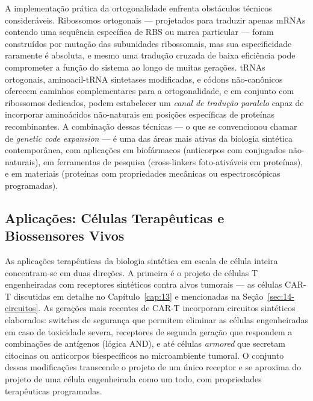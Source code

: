 A implementação prática da ortogonalidade enfrenta obstáculos técnicos consideráveis. Ribossomos ortogonais --- projetados para traduzir apenas mRNAs contendo uma sequência específica de RBS ou marca particular --- foram construídos por mutação das subunidades ribossomais, mas sua especificidade raramente é absoluta, e mesmo uma tradução cruzada de baixa eficiência pode comprometer a função do sistema ao longo de muitas gerações. tRNAs ortogonais, aminoacil-tRNA sintetases modificadas, e códons não-canônicos oferecem caminhos complementares para a ortogonalidade, e em conjunto com ribossomos dedicados, podem estabelecer um \emph{canal de tradução paralelo} capaz de incorporar aminoácidos não-naturais em posições específicas de proteínas recombinantes. A combinação dessas técnicas --- o que se convencionou chamar de \emph{genetic code expansion} --- é uma das áreas mais ativas da biologia sintética contemporânea, com aplicações em biofármacos (anticorpos com conjugados não-naturais), em ferramentas de pesquisa (cross-linkers foto-ativáveis em proteínas), e em materiais (proteínas com propriedades mecânicas ou espectroscópicas programadas).

\subsection{Aplicações: Células Terapêuticas e Biossensores Vivos}

As aplicações terapêuticas da biologia sintética em escala de célula inteira concentram-se em duas direções. A primeira é o projeto de células T engenheiradas com receptores sintéticos contra alvos tumorais --- as células CAR-T discutidas em detalhe no Capítulo~\ref{cap:13} e mencionadas na Seção~\ref{sec:14-circuitos}. As gerações mais recentes de CAR-T incorporam circuitos sintéticos elaborados: switches de segurança que permitem eliminar as células engenheiradas em caso de toxicidade severa, receptores de segunda geração que respondem a combinações de antígenos (lógica AND), e até células \emph{armored} que secretam citocinas ou anticorpos biespecíficos no microambiente tumoral. O conjunto dessas modificações transcende o projeto de um único receptor e se aproxima do projeto de uma célula engenheirada como um todo, com propriedades terapêuticas programadas.

